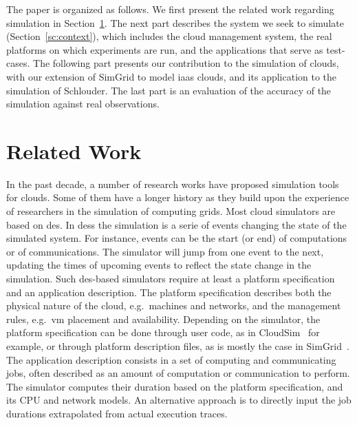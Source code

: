 The paper is  organized as follows. We first present  the related work regarding
simulation in  Section~\ref{sc:relwork}. The next  part describes the  system we
seek to simulate (Section~\ref{sc:context}), which includes the cloud management
system, the  real platforms on which  experiments are run, and  the applications
that serve  as test-cases. The following  part presents our contribution  to the
simulation of clouds,  with our extension of SimGrid to  model \ac{iaas} clouds,
and  its  application to  the  simulation  of Schlouder.  The  last  part is  an
evaluation of the accuracy of the simulation against real observations.


\section{Related Work}
\label{sc:relwork}

In the  past decade, a number  of research works have  proposed simulation tools
for clouds. Some of them have a longer history as they build upon the experience
of researchers in  the simulation of computing grids. Most  cloud simulators are
based on \ac{des}.   In \aclp{des} the simulation is a  serie of events changing
the state of  the simulated system.  For  instance, events can be  the start (or
end) of  computations or of  communications.  The  simulator will jump  from one
event to the  next, updating the times  of upcoming events to  reflect the state
change in  the simulation.   Such \ac{des}-based simulators  require at  least a
platform   specification  and   an   application   description.   The   platform
specification describes both the physical nature of the cloud, e.g.~machines and
networks,  and the  management rules,  e.g.~\ac{vm} placement  and availability.
Depending on the simulator, the platform  specification can be done through user
code,  as   in  CloudSim~\cite{cloudsim}   for  example,  or   through  platform
description  files,  as  is  mostly the  case  in  SimGrid~\cite{simgrid}.   The
application description consists  in a set of computing  and communicating jobs,
often described  as an amount  of computation  or communication to  perform. The
simulator computes their  duration based on the platform  specification, and its
CPU and  network models.  An alternative  approach is to directly  input the job
durations extrapolated from actual execution traces.


